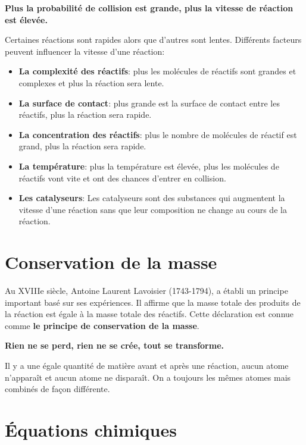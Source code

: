\documentclass[
  11pt,
  a4paper,
  openany]{book}
\providecommand{\tightlist}{%
  \setlength{\itemsep}{0pt}\setlength{\parskip}{0pt}}
\begin{document}
\textbf{Plus la probabilité de collision est grande, plus la vitesse de réaction est élevée.}

Certaines réactions sont rapides alors que d'autres sont lentes. Différents facteurs peuvent influencer la vitesse d'une réaction:

\begin{itemize}
\tightlist
\item
  \textbf{La complexité des réactifs}: plus les molécules de réactifs sont grandes et complexes et plus la réaction sera lente.
\item
  \textbf{La surface de contact}: plus grande est la surface de contact entre les réactifs, plus la réaction sera rapide.
\item
  \textbf{La concentration des réactifs}: plus le nombre de molécules de réactif est grand, plus la réaction sera rapide.
\item
  \textbf{La température}: plus la température est élevée, plus les molécules de réactifs vont vite et ont des chances d'entrer en collision.
\item
  \textbf{Les catalyseurs}: Les catalyseurs sont des substances qui augmentent la vitesse d'une réaction sans que leur composition ne change au cours de la réaction.
\end{itemize}

\hypertarget{conservation-de-la-masse}{%
\section{Conservation de la masse}\label{conservation-de-la-masse}}

Au XVIIIe siècle, Antoine Laurent Lavoisier (1743-1794), a établi un principe important basé sur ses expériences. Il affirme que la masse totale des produits de la réaction est égale à la masse totale des réactifs. Cette déclaration est connue comme \textbf{le principe de conservation de la masse}.

\textbf{Rien ne se perd, rien ne se crée, tout se transforme.}

Il y a une égale quantité de matière avant et après une réaction, aucun atome n'apparaît et aucun atome ne disparaît. On a toujours les mêmes atomes mais combinés de façon différente.

\hypertarget{uxe9quations-chimiques}{%
\section{Équations chimiques}\label{uxe9quations-chimiques}}
\end{document}
